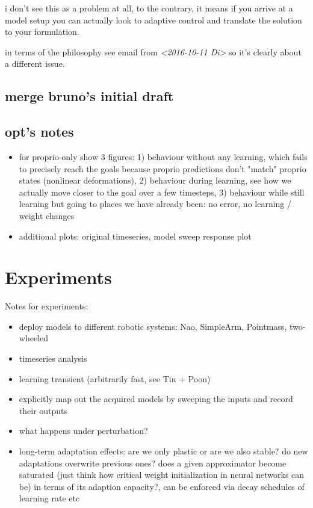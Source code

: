 \documentclass[11pt]{llncs}
\begin{document}
i don't see this as a problem at all, to the contrary, it means if you
arrive at a model setup you can actually look to adaptive control and
translate the solution to your formulation.

in terms of the philosophy see email from \textit{<2016-10-11 Di> } so it's
clearly about a different issue.

\subsection{merge bruno's initial draft}
\label{sec:org6e00d89}


\subsection{opt's notes}
\label{sec:org35938d1}
\begin{itemize}
\item for proprio-only show 3 figures: 1) behaviour without any learning,
which fails to precisely reach the goals because proprio
predictions don't "match" proprio states (nonlinear
deformations), 2) behaviour during learning, see how we actually
move closer to the goal over a few timesteps, 3) behaviour while
still learning but going to places we have already been: no error,
no learning / weight changes
\item additional plots: original timeseries, model sweep response plot
\end{itemize}



\section{Experiments}
\label{sec:org347db7c}

Notes for experiments:

\begin{itemize}
\item deploy models to different robotic systems: Nao, SimpleArm,
  Pointmass, two-wheeled
\item timeseries analysis
\item learning transient (arbitrarily fast, see Tin + Poon)
\item explicitly map out the acquired models by sweeping the inputs and
  record their outputs
\item what happens under perturbation?
\item long-term adaptation effects: are we only plastic or are we also
  stable? do new adaptations overwrite previous ones? does a given
  approximator become saturated (just think how critical weight
  initialization in neural networks can be) in terms of its adaption
  capacity?, can be enforced via decay schedules of learning rate
  etc
\end{itemize}
\end{document}

